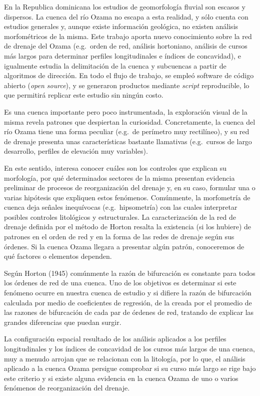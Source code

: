 \documentclass[11pt,]{article}
\begin{document}
En la Republica dominicana los estudios de geomorfología fluvial son
escasos y dispersos. La cuenca del río Ozama no escapa a esta realidad,
y sólo cuenta con estudios generales y, aunque existe información
geológica, no existen análisis morfométricos de la misma. Este trabajo
aporta nuevo conocimiento sobre la red de drenaje del Ozama (e.g.~orden
de red, análisis hortoniano, análisis de cursos más largos para
determinar perfiles longitudinales e índices de concavidad), e
igualmente estudia la delimitación de la cuenca y subcuencas a partir de
algoritmos de dirección. En todo el flujo de trabajo, se empleó software
de código abierto (\emph{open source}), y se generaron productos
mediante \emph{script} reproducible, lo que permitirá replicar este
estudio sin ningún costo.

Es una cuenca importante pero poco instrumentada, la exploración visual
de la misma revela patrones que despiertan la curiosidad. Concretamente,
la cuenca del río Ozama tiene una forma peculiar (e.g.~de perímetro muy
rectilíneo), y su red de drenaje presenta unas características bastante
llamativas (e.g.~cursos de largo desarrollo, perfiles de elevación muy
variables).

En este sentido, interesa conocer cuáles son los controles que explican
su morfología, por qué determinados sectores de la misma presentan
evidencia preliminar de procesos de reorganización del drenaje y, en su
caso, formular una o varias hipótesis que expliquen estos fenómenos.
Comúnmente, la morfometría de cuenca deja señales inequívocas
(e.g.~hipsometría) con las cuales interpretar posibles controles
litológicos y estructurales. La caracterización de la red de drenaje
definida por el método de Horton resalta la existencia (si los hubiere)
de patrones en el orden de red y en la forma de las redes de drenaje
según sus órdenes. Si la cuenca Ozama llegara a presentar algún patrón,
conoceremos de qué factores o elementos dependen.

Según Horton (1945) comúnmente la razón de bifurcación es constante para
todos los órdenes de red de una cuenca. Uno de los objetivos es
determinar si este fenómeno ocurre en nuestra cuenca de estudio y si
difiere la razón de bifurcación calculada por medio de coeficientes de
regresión, de la creada por el promedio de las razones de bifurcación de
cada par de órdenes de red, tratando de explicar las grandes diferencias
que puedan surgir.

La configuración espacial resultado de los análisis aplicados a los
perfiles longitudinales y los índices de concavidad de los cursos más
largos de una cuenca, muy a menudo arrojan que se relacionan con la
litología, por lo que, el análisis aplicado a la cuenca Ozama persigue
comprobar si su curso más largo se rige bajo este criterio y si existe
alguna evidencia en la cuenca Ozama de uno o varios fenómenos de
reorganización del drenaje.
\end{document}
